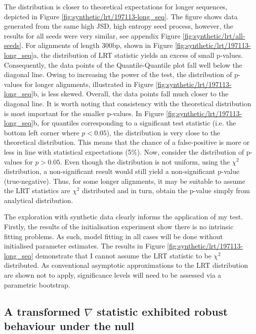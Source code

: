 The distribution is closer to theoretical expectations for longer sequences, depicted in Figure \ref{fig:synthetic/lrt/197113-long_seq}. The figure shows data generated from the same high JSD, high entropy seed process, however, the results for all seeds were very similar, see appendix Figure \ref{fig:synthetic/lrt/all-seeds}. For alignments of length 300bp, shown in Figure \ref{fig:synthetic/lrt/197113-long_seq}a, the distribution of LRT statistic yields an excess of small p-values. Consequently, the data points of the Quantile-Quantile plot fall well below the diagonal line. Owing to increasing the power of the test, the distribution of p-values for longer alignments, illustrated in Figure \ref{fig:synthetic/lrt/197113-long_seq}b, is less skewed. Overall, the data points fall much closer to the diagonal line. It is worth noting that consistency with the theoretical distribution is most important for the smaller p-values. In Figure \ref{fig:synthetic/lrt/197113-long_seq}b, for quantiles corresponding to a significant test statistic (i.e. the bottom left corner where $p<0.05$), the distribution is very close to the theoretical distribution. This means that the chance of a false-positive is more or less in line with statistical expectations (5\%). Now, consider the distribution of p-values for $p>0.05$. Even though the distribution is not uniform, using the $\chi^{2}$ distribution, a non-significant result would still yield a non-significant p-value (true-negative). Thus, for some longer alignments, it may be suitable to assume the LRT statistics are $\chi^{2}$ distributed and in turn, obtain the p-value simply from analytical distribution. 



The exploration with synthetic data clearly informs the application of my test. Firstly, the results of the initialisation experiment show there is no intrinsic fitting problems. As such, model fitting in all cases will be done without initialised parameter estimates. The results in Figure \ref{fig:synthetic/lrt/197113-long_seq} demonstrate that I cannot assume the LRT statistic to be $\chi^{2}$ distributed. As conventional asymptotic approximations to the LRT distribution are shown not to apply, significance levels will need to be assessed via a parametric bootstrap. 

\subsection*{A transformed $\nabla$ statistic exhibited robust behaviour under the null}

